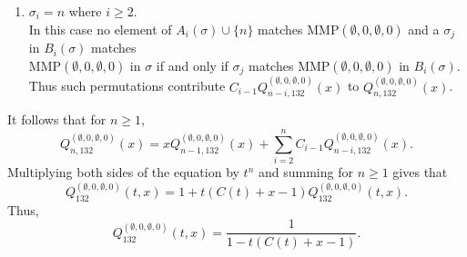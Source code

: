 \documentclass[
final,nomarks
]{dmtcs-episciences}
\newcommand{\Qmm}[1]{Q_{132}^{(#1)}(t,x)}
\newcommand{\Qmmn}[2]{Q_{#2,132}^{(#1)}(x)}
\newcommand{\MMP}{\mathrm{MMP}}
\begin{document}
\begin{enumerate}[{\bf Case }\bf 1.]
	\item \begin{math}\sigma_i =n\end{math} where \begin{math}i \geq 2\end{math}.\\
	In this case no element of \begin{math}A_i(\sigma) \cup \{n\}\end{math} matches \begin{math}\MMP(\emptyset,0,\emptyset,0)\end{math} and 
	a \begin{math}\sigma_j\end{math} in \begin{math}B_i(\sigma)\end{math} matches \\\begin{math}\MMP(\emptyset,0,\emptyset,0)\end{math} 
	in \begin{math}\sigma\end{math} if and only if \begin{math}\sigma_j\end{math}  matches \begin{math}\MMP(\emptyset,0,\emptyset,0)\end{math} 
	in \begin{math}B_i(\sigma)\end{math}. Thus such permutations contribute \begin{math}C_{i-1}\Qmmn{\emptyset,0,\emptyset,0}{n-i}\end{math} to 
	\begin{math}\Qmmn{\emptyset,0,\emptyset,0}{n}\end{math}.
	
\end{enumerate}

It follows that for \begin{math}n \geq 1\end{math}, 
\begin{equation}
\Qmmn{\emptyset,0,\emptyset,0}{n}=x\Qmmn{\emptyset,0,\emptyset,0}{n-1}+\sum_{i=2}^{n}C_{i-1}\Qmmn{\emptyset,0,\emptyset,0}{n-i}.
\end{equation}
Multiplying both sides of the equation by \begin{math}t^n\end{math} and summing for \begin{math}n\geq 1\end{math} gives that
\begin{equation}
\Qmm{\emptyset,0,\emptyset,0}=1+t(C(t)+x-1)\Qmm{\emptyset,0,\emptyset,0}.
\end{equation}
Thus,
\begin{equation}
\Qmm{\emptyset,0,\emptyset,0}=\frac{1}{1-t(C(t)+x-1)}.
\end{equation}
\end{document}
